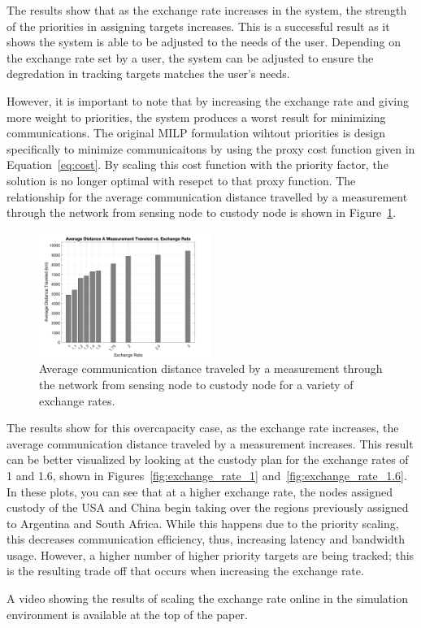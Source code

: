     The results show that as the exchange rate increases in the system, the strength of the priorities in assigning targets increases. 
    This is a successful result as it shows the system is able to be adjusted to the needs of the user. 
    Depending on the exchange rate set by a user, the system can be adjusted to ensure the degredation in tracking targets matches the user's needs.

    However, it is important to note that by increasing the exchange rate and giving more weight to priorities, the system produces a worst result for minimizing communications. 
    The original MILP formulation wihtout priorities is design specifically to minimize communicaitons by using the proxy cost function given in Equation~\eqref{eq:cost}.
    By scaling this cost function with the priority factor, the solution is no longer optimal with resepct to that proxy function. 
    The relationship for the average communication distance travelled by a measurement through the network from sensing node to custody node is shown in Figure~\ref{fig:comm_distance_vs_exchange_rate}.

    \begin{figure}[h]
        \centering
        \includegraphics[width=0.5\textwidth]{figs/distance_vs_exchange.png}
        \caption{Average communication distance traveled by a measurement through the network from sensing node to custody node for a variety of exchange rates.}
        \label{fig:comm_distance_vs_exchange_rate}
    \end{figure}

    The results show for this overcapacity case, as the exchange rate increases, the average communication distance traveled by a measurement increases. 
    This result can be better visualized by looking at the custody plan for the exchange rates of 1 and 1.6, shown in Figures~\ref{fig:exchange_rate_1} and~\ref{fig:exchange_rate_1.6}.
    In these plots, you can see that at a higher exchange rate, the nodes assigned custody of the USA and China begin taking over the regions previously assigned to Argentina and South Africa. 
    While this happens due to the priority scaling, this decreases communication efficiency, thus, increasing latency and bandwidth usage. However, a higher number of higher priority targets are being tracked; 
    this is the resulting trade off that occurs when increasing the exchange rate. 

    A video showing the results of scaling the exchange rate online in the simulation environment is available at the top of the paper.